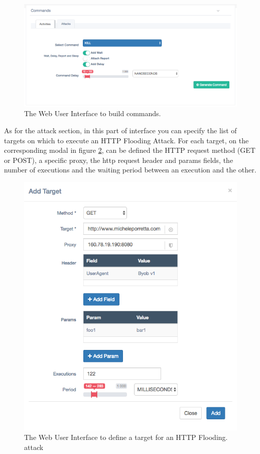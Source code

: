 \begin{figure}[tp]
  \centering
  \includegraphics[scale=0.45]{./fig/commandsWUI.png}
  \caption{The Web User Interface to build commands.}
    \label{fig:commands-wui}
\end{figure}

As for the attack section, in this part of interface you can specify the list of targets on which to execute an HTTP Flooding Attack. For each target, on the corresponding modal in figure \ref{fig:target-wui}, can be defined the HTTP request method (GET or POST), a specific proxy, the http request header and params fields, the number of executions and the waiting period between an execution and the other.

\begin{figure}[tp]
  \centering
  \includegraphics[scale=0.45]{./fig/targetWUI.png}
  \caption{The Web User Interface to define a target for an HTTP Flooding. attack}
    \label{fig:target-wui}
\end{figure}

